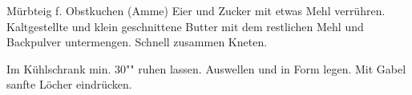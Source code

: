 \begin{MyRecipe}{Mürbteig f. Obstkuchen (Amme)}{}{}
	Eier und Zucker mit etwas Mehl verrühren. Kaltgestellte und klein geschnittene Butter mit dem restlichen Mehl und Backpulver untermengen. Schnell zusammen Kneten.\par\bigskip
	
	
	Im Kühlschrank min. 30"" ruhen lassen. Auswellen und in Form legen. Mit Gabel sanfte Löcher eindrücken.
\end{MyRecipe}